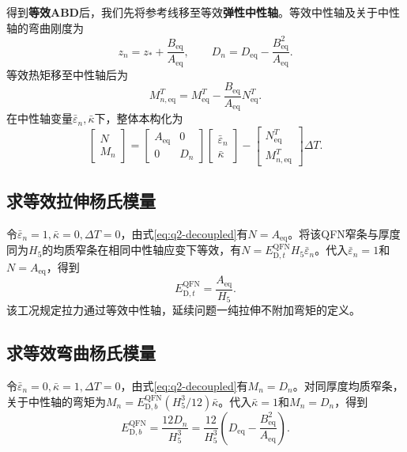 \documentclass[draft,12pt,a4paper]{ctexart}
\theoremstyle{definition}
\begin{document}
得到\textbf{等效ABD}后，我们先将参考线移至等效\textbf{弹性中性轴}。等效中性轴及关于中性轴的弯曲刚度为
\begin{equation}\label{eq:q2-neutral}
z_n=z_*+\frac{B_{\mathrm{eq}}}{A_{\mathrm{eq}}},
\qquad
D_n=D_{\mathrm{eq}}-\frac{B_{\mathrm{eq}}^2}{A_{\mathrm{eq}}}.
\end{equation}
等效热矩移至中性轴后为
\begin{equation}\label{eq:q2-MnTeq}
M_{n,\mathrm{eq}}^T
=M_{\mathrm{eq}}^T
-\frac{B_{\mathrm{eq}}}{A_{\mathrm{eq}}}N_{\mathrm{eq}}^T.
\end{equation}
在中性轴变量$\bar\varepsilon_n,\bar\kappa$下，整体本构化为
\begin{equation}\label{eq:q2-decoupled}
\begin{bmatrix}N\\M_n\end{bmatrix}
=
\begin{bmatrix}A_{\mathrm{eq}}&0\\0&D_n\end{bmatrix}
\begin{bmatrix}\bar\varepsilon_n\\\bar\kappa\end{bmatrix}
-
\begin{bmatrix}N_{\mathrm{eq}}^T\\M_{n,\mathrm{eq}}^T\end{bmatrix}
\Delta T.
\end{equation}

\subsection{求等效拉伸杨氏模量}

令$\bar\varepsilon_n=1,\bar\kappa=0,\Delta T=0$，由式\eqref{eq:q2-decoupled}有$N=A_{\mathrm{eq}}$。将该QFN窄条与厚度同为$H_5$的均质窄条在相同中性轴应变下等效，有$N=E_{\mathrm D,t}^{\mathrm{QFN}}H_5\bar\varepsilon_n$。代入$\bar\varepsilon_n=1$和$N=A_{\mathrm{eq}}$，得到
\begin{equation}\label{eq:q2-Edt}
E_{\mathrm D,t}^{\mathrm{QFN}}
=\frac{A_{\mathrm{eq}}}{H_5}.
\end{equation}
该工况规定拉力通过等效中性轴，延续问题一纯拉伸不附加弯矩的定义。

\subsection{求等效弯曲杨氏模量}

令$\bar\varepsilon_n=0,\bar\kappa=1,\Delta T=0$，由式\eqref{eq:q2-decoupled}有$M_n=D_n$。对同厚度均质窄条，关于中性轴的弯矩为$M_n=E_{\mathrm D,b}^{\mathrm{QFN}}(H_5^3/12)\bar\kappa$。代入$\bar\kappa=1$和$M_n=D_n$，得到
\begin{equation}\label{eq:q2-Edb}
E_{\mathrm D,b}^{\mathrm{QFN}}
=\frac{12D_n}{H_5^3}
=\frac{12}{H_5^3}
\left(D_{\mathrm{eq}}-
\frac{B_{\mathrm{eq}}^2}{A_{\mathrm{eq}}}\right).
\end{equation}
\end{document}
